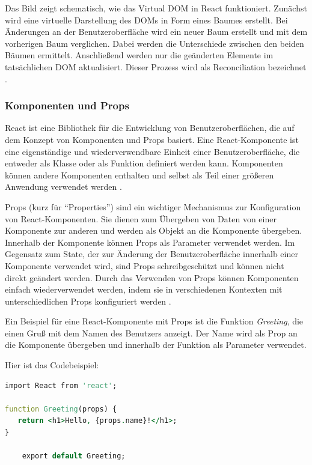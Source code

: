 Das Bild zeigt schematisch, wie das Virtual DOM in React funktioniert. Zunächst wird eine virtuelle Darstellung des DOMs in Form eines Baumes erstellt. Bei Änderungen an der Benutzeroberfläche wird ein neuer Baum erstellt und mit dem vorherigen Baum verglichen. Dabei werden die Unterschiede zwischen den beiden Bäumen ermittelt. Anschließend werden nur die geänderten Elemente im tatsächlichen DOM aktualisiert. Dieser Prozess wird als Reconciliation bezeichnet \cite{ReactVirtualDOM}.

\subsubsection{Komponenten und Props}
React ist eine Bibliothek für die Entwicklung von Benutzeroberflächen, die auf dem Konzept von Komponenten und Props basiert. Eine React-Komponente ist eine eigenständige und wiederverwendbare Einheit einer Benutzeroberfläche, die entweder als Klasse oder als Funktion definiert werden kann. Komponenten können andere Komponenten enthalten und selbst als Teil einer größeren Anwendung verwendet werden \cite{ReactComponentsAndProps}.

Props (kurz für "`Properties"') sind ein wichtiger Mechanismus zur Konfiguration von React-Komponenten. Sie dienen zum Übergeben von Daten von einer Komponente zur anderen und werden als Objekt an die Komponente übergeben. Innerhalb der Komponente können Props als Parameter verwendet werden. Im Gegensatz zum State, der zur Änderung der Benutzeroberfläche innerhalb einer Komponente verwendet wird, sind Props schreibgeschützt und können nicht direkt geändert werden. Durch das Verwenden von Props können Komponenten einfach wiederverwendet werden, indem sie in verschiedenen Kontexten mit unterschiedlichen Props konfiguriert werden \cite{ReactComponentsAndProps}.

Ein Beispiel für eine React-Komponente mit Props ist die Funktion \emph{Greeting}, die einen Gruß mit dem Namen des Benutzers anzeigt. Der Name wird als Prop an die Komponente übergeben und innerhalb der Funktion als Parameter verwendet.

\newpage
Hier ist das Codebeispiel:
\begin{lstlisting}[language=vhdl,
	frame=single,           % Ein Rahmen um den Code
	framexleftmargin=15pt,  % Rahmen link von den Zahlen
	style=algoBericht,
	label={Props-Komponenten},
	captionpos=b ,          % Caption unter den Code setzen
	caption={Beispiel Kompoonente mit Probs in React}]
import React from 'react';
	
function Greeting(props) {
   return <h1>Hello, {props.name}!</h1>;
}
	
	export default Greeting;
\end{lstlisting}


